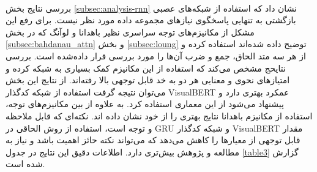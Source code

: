 \paragraph{}{
    بررسی نتایج بخش 
    \ref{subsec:analysis-rnn}
    نشان داد که استفاده از شبکه‌های عصبی بازگشتی به تنهایی پاسخگوی نیازهای مجموعه داده
    مورد نظر نیست. برای رفع این مشکل از مکانیزم‌های توجه سراسری نظیر باهدانا و لوآنگ که
    در بخش 
    \ref{subsec:bahdanau_attn}
    و
    بخش
    \ref{subsec:loung}
    توضیح داده شده‌اند استفاده کرده و از هر سه متد 
    الحاق، جمع و ضرب آن‌ها را مورد بررسی قرار داده‌شده است. بررسی نتایحج مشخص می‌کند که استفاده
    از این مکانیزم کمک بسیاری به شبکه کرده و امتیازهای نحوی و معنایی هر دو به خد قابل توجهی
    بالا رفته‌اند. از نتایج این بخش می‌توان نتیجه گرفت استفاده از شبکه کدگذار
    VisualBERT
    عمکرد بهتری دارد و پیشنهاد می‌شود از این معماری استفاده کرد. به علاوه از بین 
    مکانیزم‌های توجه، استفاده از مکانیزم باهدانا نتایج بهتری را از خود نشان داده اند.
    نکته‌ای که قابل ملاحظه و توجه است، استفاده از روش الحاقی در 
    GRU
    و شبکه کدگذار 
    VisualBERT
    مقدار قابل توجهی از معیارها را کاهش می‌دهد که می‌تواند نکته حائز اهمیت باشد و نیاز به
    مطالعه و پژوهش بیش‌تری دارد. اطلاعات دقیق این نتایج در جدول
    \ref{table3}
    گزارش شده است. 

}

